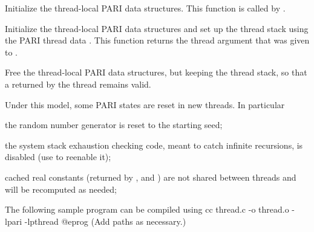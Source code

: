 Initialize the thread-local PARI data structures. This function is called by
.

Initialize the thread-local PARI data structures and set up the thread stack
using the PARI thread data . This function returns the thread
argument  that was given to .

Free the thread-local PARI data structures, but keeping the thread stack, so
that a  returned by the thread remains valid.

\noindent Under this model, some PARI states are reset in new threads. In
particular

\item the random number generator is reset to the starting seed;

\item the system stack exhaustion checking code, meant to catch infinite
recursions, is disabled (use  to reenable it);

\item cached real constants (returned by ,  and
) are not shared between threads and will be recomputed as
needed;

\noindent The following sample program can be compiled using
\bprog
    cc thread.c -o thread.o -lpari -lpthread
@eprog\noindent
(Add  paths as necessary.)

\noindent{}

\vfill\eject
